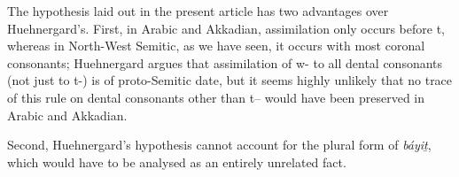 \documentclass[oldfontcommands,oneside,a4paper,11pt]{article}
\newcommand{\forme}[1]{\textit{#1}}
\begin{document}
\begin{sloppypar}
	 The hypothesis laid out in the present article has two advantages over Huehnergard's. First, in Arabic and Akkadian, assimilation only occurs before t, whereas in North-West Semitic, as we have seen, it occurs with most coronal consonants; Huehnergard argues that assimilation of w- to all dental consonants (not just to t-) is of proto-Semitic date, but it seems highly unlikely that no trace of this rule on dental consonants other than t-- would have been preserved in Arabic and Akkadian.
	 
	 Second, Huehnergard's hypothesis cannot account for the plural form of \forme{báyiṯ}, which would have to be analysed as an entirely unrelated fact.
	 
	
 \end{sloppypar}


\end{document}
